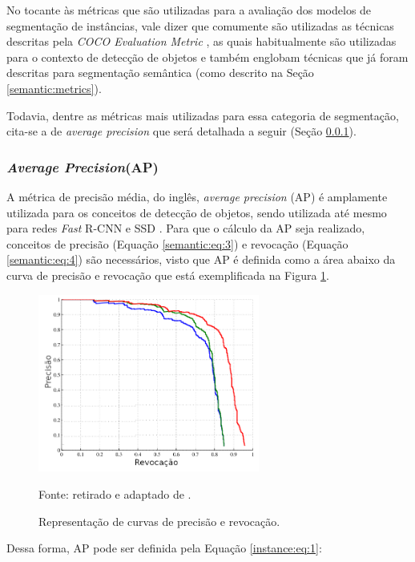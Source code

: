 No tocante às métricas que são utilizadas para a avaliação dos modelos de segmentação de instâncias, vale dizer que comumente são utilizadas as técnicas descritas pela \textit{COCO Evaluation Metric} \cite{Lin2016}, as quais habitualmente são utilizadas para o contexto de detecção de objetos e também englobam técnicas que já foram descritas para segmentação semântica (como descrito na Seção \ref{semantic:metrics}).

Todavia, dentre as métricas mais utilizadas para essa categoria de segmentação, cita-se a de \textit{average precision} que será detalhada a seguir (Seção \ref{instance:AP}).


\subsubsection{\textit{Average Precision}(AP)}
\label{instance:AP}

A métrica de precisão média, do inglês, \textit{average precision} (AP) é amplamente utilizada para os conceitos de detecção de objetos, sendo utilizada até mesmo para redes \textit{Fast} R-CNN \cite{Girshick2014} e SSD \cite{Liu2015a}. Para que o cálculo da AP seja realizado, conceitos de precisão (Equação \ref{semantic:eq:3}) e revocação (Equação \ref{semantic:eq:4}) são necessários, visto que AP é definida como a área abaixo da curva de precisão e revocação \cite{Hariharan2014} que está exemplificada na Figura \ref{instance:fig:1}.

\begin{figure}[H]
    \centering
    \caption{Representação de curvas de precisão e revocação.}
    \includegraphics[height=2.3in]{recursos/imagens/instance/prec_revo.png}
    \label{instance:fig:1}

    \vspace*{1 cm}
    Fonte: retirado e adaptado de \cite{Hariharan2014}.
\end{figure}

Dessa forma, AP pode ser definida pela Equação \ref{instance:eq:1}:

